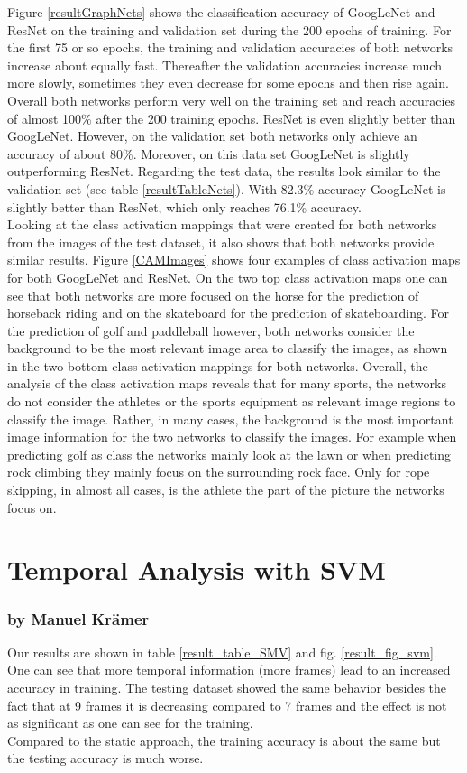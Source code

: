 \documentclass[11pt]{report}
\begin{document}
Figure \ref{resultGraphNets} shows the classification accuracy of GoogLeNet and
ResNet on the training and validation set during the 200 epochs of training.
For the first 75 or so epochs, the training
and validation accuracies of both networks increase about equally fast.
Thereafter the validation accuracies increase much more slowly, sometimes they
even decrease for some epochs and then rise again. Overall both networks perform
very well on the training set and reach accuracies of almost 100\% after the 200
training epochs.
ResNet is even slightly better than GoogLeNet. However, on the validation set
both networks only achieve an accuracy of about 80\%. Moreover, on this data
set GoogLeNet is slightly outperforming ResNet. Regarding the test data, the
results look similar to the validation set (see table \ref{resultTableNets}).
With 82.3\% accuracy GoogLeNet is slightly better than ResNet, which only
reaches 76.1\% accuracy. \\
Looking at the class activation mappings that were created for both networks from the images of the
test dataset, it also shows that both networks provide similar results. Figure
\ref{CAMImages} shows four examples of class activation maps for both GoogLeNet and ResNet. On
the two top class activation maps one can see that both networks are more
focused on the horse for the prediction of horseback riding and on the
skateboard for the prediction of skateboarding. For the prediction of golf and
paddleball however, both networks consider the background to be the most
relevant image area to classify the images, as shown in the two bottom class
activation mappings for both networks. Overall, the analysis of the class
activation maps
reveals that for many sports, the networks do not consider the athletes or the
sports equipment as relevant image regions to classify the image. Rather, in
many cases, the background is the most important image information for the two
networks to classify the images. For example when predicting golf as class the
networks mainly look at the lawn or when predicting rock climbing they
mainly focus on the surrounding rock face. Only for rope skipping, in almost
all cases, is the athlete the part of the picture the networks focus on.

\section{Temporal Analysis with SVM}
\subsubsection{by Manuel Krämer}
Our results are shown in table \ref{result_table_SMV} and fig. \ref{result_fig_svm}.
One can see that more temporal information (more frames) lead to an increased accuracy in training. The testing dataset showed the same behavior besides the fact that at 9 frames it is decreasing compared to 7 frames and the effect is not as significant as one can see for the training.\\
Compared to the static approach, the training accuracy is about the same but the testing accuracy is much worse.
\end{document}
